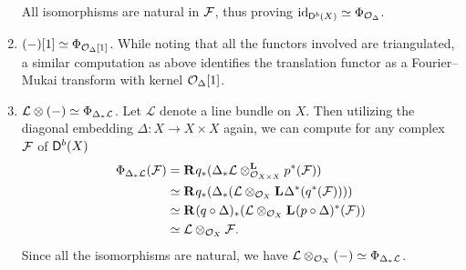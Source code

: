 \begin{example}
\begin{enumerate}[label = (\roman*)]
{    %
    All isomorphisms are natural in $\F$, thus proving $\id{\derb{X}} \iso \fm{\struct{\Delta}}$.
    }
    \item{$(-)[1] \iso \fm{\struct{\Delta}[1]}$. While noting that all the functors involved are triangulated, a similar computation as above identifies the translation functor as a Fourier--Mukai transform with kernel $\struct{\Delta}[1]$.} \label{shift is FM}
    \item{
    $\mathcal L \otimes (-) \iso \fm{\Delta_*\mathcal L}$. Let $\mathcal L$ denote a line bundle on $X$. Then utilizing the diagonal embedding $\Delta \colon X \to X \times X$ again, we can compute for any complex $\F$ of $\derb{X}$
    \begin{align*}
        \fm{{\Delta_*\mathcal L}}(\F) &= \rderived{}{q_*}(\derivedtensor{\Delta_*\mathcal L}{p^*(\F)}{\struct{X \times X}}) \\
        &\iso \rderived{}{q_*}(\Delta_*(\mathcal L \otimes_{\struct{X}}\lderived{}{\Delta^*}({q^*}(\F)))) \\
        &\iso \rderived{}{(q \circ \Delta)_*}(\mathcal L \otimes_{\struct{X}} \lderived{}{(p \circ \Delta)^*}(\F)) \\
        &\iso \mathcal L \otimes_{\struct{X}} \F.
    \end{align*}
    Since all the isomorphisms are natural, we have $\mathcal L \otimes_{\struct{X}} (-) \iso \fm{\Delta_*\mathcal L}$.
}
\end{enumerate}
\end{example}
